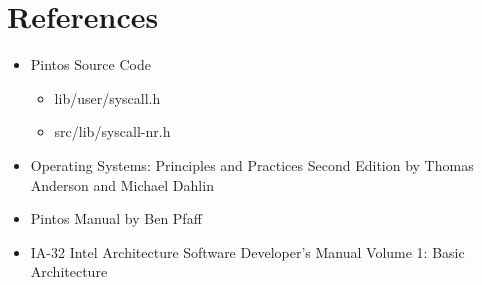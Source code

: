 \documentclass[11pt, letterpaper]{article}
\begin{document}
\pagebreak

\section*{References}
	
\begin{itemize}
\item Pintos Source Code
	\begin{itemize}
	\item lib/user/syscall.h
	\item src/lib/syscall-nr.h
	\end{itemize}
\item Operating Systems: Principles and Practices Second Edition by Thomas Anderson and Michael Dahlin
\item Pintos Manual by Ben Pfaff
\item IA-32 Intel Architecture Software Developer's Manual Volume 1: Basic Architecture
\end{itemize}
\end{document}
